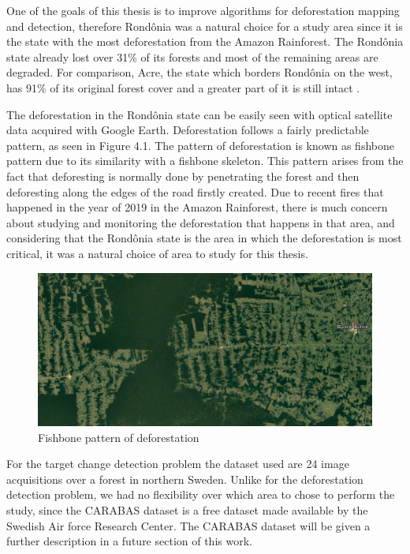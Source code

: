 One of the goals of this thesis is to improve algorithms for deforestation mapping and detection, therefore Rondônia was a natural choice for a study area since it is the state with the most deforestation from the Amazon Rainforest. The Rondônia
state already lost over 31\% of its forests and most of the remaining areas are degraded.
For comparison, Acre, the state which borders Rondônia on the west, has 91\% of its
original forest cover and a greater part of it is still intact \cite{rondoniaDeforestation}. 

The deforestation in the Rondônia state can be easily seen with optical satellite data
acquired with Google Earth. Deforestation follows a fairly predictable pattern, as seen in
Figure 4.1. The pattern of deforestation is known as fishbone pattern due to its similarity
with a fishbone skeleton. This pattern arises from the fact that deforesting is normally done
by penetrating the forest and then deforesting along the edges of the road firstly created. Due to recent fires that happened in the year of 2019 in the Amazon Rainforest, there
is much concern about studying and monitoring the deforestation that happens in that
area, and considering that the Rondônia state is the area in which the deforestation is
most critical, it was a natural choice of area to study for this thesis.

\begin{figure}[H]
    \centering
    \includegraphics[width=\linewidth]{Cap2-Methods/fishbone.png}
    \caption{Fishbone pattern of deforestation}
    \label{fig:fishbone}
\end{figure}

For the target change detection problem the dataset used are 24 image acquisitions over a forest in northern Sweden. Unlike for the deforestation detection problem, we had no flexibility over which area to chose to perform the study, since the CARABAS dataset is a free dataset made available by the Swedish Air force Research Center. The CARABAS dataset will be given a further description in a future section of this work. 
